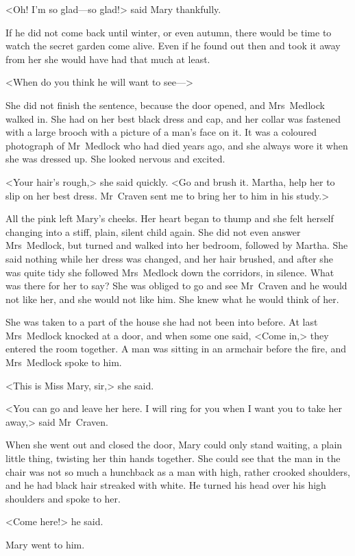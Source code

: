 <Oh! I'm so glad—so glad!> said Mary thankfully.

If he did not come back until winter, or even autumn, there would be time to watch the secret garden come alive. Even if he found out then and took it away from her she would have had that much at least.

<When do you think he will want to see—>

She did not finish the sentence, because the door opened, and Mrs~Medlock walked in. She had on her best black dress and cap, and her collar was fastened with a large brooch with a picture of a man's face on it. It was a coloured photograph of Mr~Medlock who had died years ago, and she always wore it when she was dressed up. She looked nervous and excited.

<Your hair's rough,> she said quickly. <Go and brush it. Martha, help her to slip on her best dress. Mr~Craven sent me to bring her to him in his study.>

All the pink left Mary's cheeks. Her heart began to thump and she felt herself changing into a stiff, plain, silent child again. She did not even answer Mrs~Medlock, but turned and walked into her bedroom, followed by Martha. She said nothing while her dress was changed, and her hair brushed, and after she was quite tidy she followed Mrs~Medlock down the corridors, in silence. What was there for her to say? She was obliged to go and see Mr~Craven and he would not like her, and she would not like him. She knew what he would think of her.

She was taken to a part of the house she had not been into before. At last Mrs~Medlock knocked at a door, and when some one said, <Come in,> they entered the room together. A man was sitting in an armchair before the fire, and Mrs~Medlock spoke to him.

<This is Miss Mary, sir,> she said.

<You can go and leave her here. I will ring for you when I want you to take her away,> said Mr~Craven.

When she went out and closed the door, Mary could only stand waiting, a plain little thing, twisting her thin hands together. She could see that the man in the chair was not so much a hunchback as a man with high, rather crooked shoulders, and he had black hair streaked with white. He turned his head over his high shoulders and spoke to her.

<Come here!> he said.

Mary went to him.

